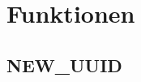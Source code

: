\appendix
\section{Funktionen}
\label{app:funktionen}

\subsection{NEW\_UUID}
\label{app:funktionen.new_uuid}

